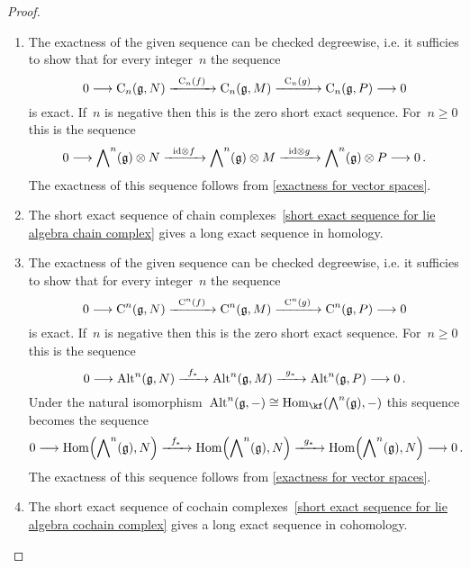 \begin{proof}
  \leavevmode
  \begin{enumerate}
    \item
      The exactness of the given sequence can be checked degreewise, i.e. it sufficies to show that for every integer~$n$ the sequence
      \[
        0
        \to
        \Chain_n(\glie, N)
        \xto{\Chain_n(f)}
        \Chain_n(\glie, M)
        \xto{\Chain_n(g)}
        \Chain_n(\glie, P)
        \to
        0
      \]
      is exact.
      If~$n$ is negative then this is the zero short exact sequence.
      For~$n \geq 0$ this is the sequence
      \[
        0
        \to
        \Exterior^n(\glie) \otimes N
        \xto{\id \otimes f}
        \Exterior^n(\glie) \otimes M
        \xto{\id \otimes g}
        \Exterior^n(\glie) \otimes P
        \to
        0 \,.
      \]
      The exactness of this sequence follows from \cref{exactness for vector spaces}.
    \item
      The short exact sequence of chain complexes~\eqref{short exact sequence for lie algebra chain complex} gives a long exact sequence in homology.
    \item
      The exactness of the given sequence can be checked degreewise, i.e. it sufficies to show that for every integer~$n$ the sequence
      \[
        0
        \to
        \Chain^n(\glie, N)
        \xto{\Chain^n(f)}
        \Chain^n(\glie, M)
        \xto{\Chain^n(g)}
        \Chain^n(\glie, P)
        \to
        0
      \]
      is exact.
      If~$n$ is negative then this is the zero short exact sequence.
      For~$n \geq 0$ this is the sequence
      \[
        0
        \to
        \Alt^n(\glie, N)
        \xto{f_*}
        \Alt^n(\glie, M)
        \xto{g_*}
        \Alt^n(\glie, P)
        \to
        0 \,.
      \]
      Under the natural isomorphism~$\Alt^n(\glie, -) \cong \Hom_{\kf}( \Exterior^n(\glie), -)$ this sequence becomes the sequence
      \[
        0
        \to
        \Hom\Bigl( \Exterior^n(\glie), N \Bigr)
        \xto{f_*}
        \Hom\Bigl( \Exterior^n(\glie), N \Bigr)
        \xto{g_*}
        \Hom\Bigl( \Exterior^n(\glie), N \Bigr)
        \to
        0 \,.
      \]
      The exactness of this sequence follows from \cref{exactness for vector spaces}.
    \item
      The short exact sequence of cochain complexes~\eqref{short exact sequence for lie algebra cochain complex} gives a long exact sequence in cohomology.
    \qedhere
  \end{enumerate}
\end{proof}





